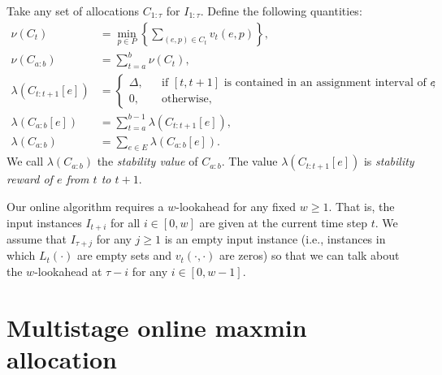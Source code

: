 \documentclass[11pt,a4paper]{article}
\renewcommand{\leq}{\leqslant}
\renewcommand{\geq}{\geqslant}
\begin{document}
Take any set of allocations $C_{1:\tau}$ for $I_{1:\tau}$.  
Define the following quantities:
\begin{align*}
\nu(C_t)  & = \min_{p \in P} \left\{\sum_{(e,p) \in C_t} v_t(e,p)\right\}, \\
\nu(C_{a:b}) & = \sum_{t=a}^b \nu(C_t), \\
\lambda(C_{t:t+1}[e]) & = \left\{\begin{array}{lcl}
	\Delta, & & \mbox{if $[t,t+1]$ is contained in an assignment interval of $e$}; \\
	0, & & \mbox{otherwise},
\end{array}\right. \\
\lambda(C_{a:b}[e]) & = \sum_{t=a}^{b-1} \lambda(C_{t:t+1}[e]), \\
\lambda(C_{a:b}) & = \sum_{e \in E} \lambda(C_{a:b}[e]).
\end{align*}
We call $\lambda(C_{a:b})$ the \emph{stability value} of $C_{a:b}$.  The value $\lambda(C_{t:t+1}[e])$ is \emph{stability reward of $e$ from $t$ to $t+1$}.

Our online algorithm requires a $w$-lookahead for any fixed $w \geq 1$.  That is, the input instances $I_{t+i}$ for all $i \in [0,w]$ are given at the current time step $t$.  
We assume that $I_{\tau+j}$ for any $j \geq 1$ is an empty input instance (i.e., instances in which $L_t(\cdot)$ are empty sets and $v_t(\cdot,\cdot)$ are zeros) so that we can talk about the $w$-lookahead at $\tau - i$ for any $i \in [0,w-1]$.





%




\section{Multistage online maxmin allocation}
\end{document}
